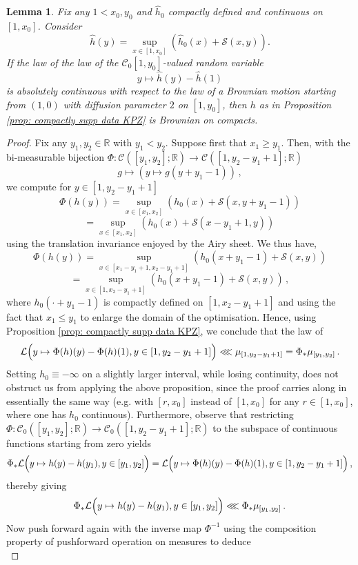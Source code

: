 \documentclass[12pt]{report}
\theoremstyle{plain}
\newtheorem{lemma}[theorem]{Lemma}
\newcommand{\R}{\ensuremath{\mathbb{R}}}
\begin{document}
\begin{lemma}\label{lemma: restriction}
Fix any $1<x_0,y_0$ and $\hat{h}_0$ compactly defined and continuous on $[1,x_0]$. Consider  
\[
\hat{h}(y) = \sup_{x\in[1,x_0]}(\hat{h}_0(x)+\mathcal{S}(x,y)).
\]
If the law of the law of the $\mathcal{C}_0[1,y_0]$-valued random variable
$$y\mapsto \hat{h}(y)-\hat{h}(1)$$
is absolutely continuous with respect to the law of a Brownian motion starting from $(1,0)$ with diffusion parameter $2$ on $[1,y_0]$, then $h$ as in Proposition \ref{prop: compactly supp data KPZ} is Brownian on compacts.
\end{lemma}

\begin{proof}
Fix any $y_1, y_2\in\R$ with $y_1<y_2$. Suppose first that $x_1\geq y_1$. Then, with the bi-measurable bijection $\Phi: \mathcal{C}([y_1,y_2];\R) \to \mathcal{C}([1, y_2-y_1+1];\R)$ 
\[g\mapsto (y\mapsto g(y+y_1-1))\,,\]
we compute for $y\in [1, y_2-y_1+1]$
\[
\Phi(h(y)) = \sup_{x\in[x_1,x_2]}(h_0(x)+\mathcal{S}(x,y+y_1-1))
\]
\[
= \sup_{x\in[x_1,x_2]}(h_0(x)+\mathcal{S}(x-y_1+1,y))\,
\]
using the translation invariance enjoyed by the Airy sheet. We thus have,
\[
\Phi(h(y)) = \sup_{x\in[x_1-y_1+1,x_2-y_1+1]}(h_0(x+y_1-1)+\mathcal{S}(x,y))
\]
\[
= \sup_{x\in[1,x_2-y_1+1]}(h_0(x+y_1-1)+\mathcal{S}(x,y))\,,
\]
where $h_0(\cdot+y_1-1)$ is compactly defined on $[1,x_2-y_1+1]$ and using the fact that $x_1\leq y_1$ to enlarge the domain of the optimisation. Hence, using Proposition \ref{prop: compactly supp data KPZ}, we conclude that the law of 
\[
\mathcal{L}\Bigl(y\mapsto \Phi(h)(y)-\Phi(h)(1), y\in [1, y_2-y_1+1]\Bigr)\lll \mu_{[1, y_2-y_1+1]} = \Phi_*\mu_{[y_1,y_2]}\,.
\]
Setting $h_0\equiv-\infty$ on a slightly larger interval, while losing continuity, does not obstruct us from applying the above proposition, since the proof carries along in essentially the same way (e.g. with $[r,x_0]$ instead of $[1,x_0]$ for any $r\in [1,x_0]$, where one has $h_0$ continuous). Furthermore, observe that restricting $\Phi: \mathcal{C}_0([y_1,y_2];\R) \to \mathcal{C}_0([1, y_2-y_1+1];\R)$ to the subspace of continuous functions starting from zero yields 
\[
\Phi_{*}\mathcal{L}\Bigl(y\mapsto h(y)-h(y_1), y\in [y_1, y_2]\Bigr) = \mathcal{L}\Bigl(y\mapsto \Phi(h)(y)-\Phi(h)(1), y\in [1, y_2-y_1+1]\Bigr)\,,
\]
thereby giving 
\[
\Phi_{*}\mathcal{L}\Bigl(y\mapsto h(y)-h(y_1), y\in [y_1, y_2]\Bigr) \lll \Phi_*\mu_{[y_1,y_2]}\,.
\]
Now push forward again with the inverse map $\Phi^{-1}$  using the composition property of pushforward operation on measures to deduce 
\[
\]
\end{proof}
\end{document}
